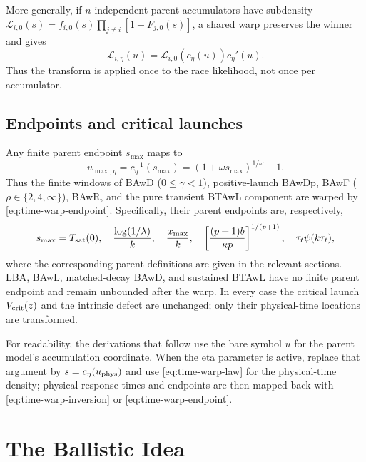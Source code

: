 \documentclass[12pt]{article}
\theoremstyle{remark}
\begin{document}
More generally, if \(n\) independent parent accumulators have subdensity \(\mathcal{L}_{i,0}(s)=f_{i,0}(s)\prod_{j\ne i}[1-F_{j,0}(s)]\), a shared warp preserves the winner and gives
\begin{equation}
  \mathcal{L}_{i,\eta}(u)
   =\mathcal{L}_{i,0}(c_\eta(u))c_\eta'(u).
  \label{eq:time-warp-race}
\end{equation}
Thus the transform is applied once to the race likelihood, not once per accumulator.

\subsection{Endpoints and critical launches}
Any finite parent endpoint \(s_{\max}\) maps to
\begin{equation}
  u_{\max,\eta}=c_\eta^{-1}(s_{\max})
    =(1+\omega s_{\max})^{1/\omega}-1.
  \label{eq:time-warp-endpoint}
\end{equation}
Thus the finite windows of BAwD (\(0\le\gamma<1\)), positive-launch BAwDp, BAwF (\(\rho\in\{2,4,\infty\}\)), BAwR, and the pure transient BTAwL component are warped by
\eqref{eq:time-warp-endpoint}. Specifically, their parent endpoints are,
respectively,
\begin{equation}
  s_{\max}=T_{\rm sat}(0),\quad
  \frac{\log(1/\lambda)}{k},\quad
  \frac{x_{\max}}{k},\quad
  \left[\frac{(p+1)b}{\kappa p}\right]^{1/(p+1)},\quad
  \tau_t\psi(k\tau_t),
  \label{eq:time-warp-endpoints-list}
\end{equation}
where the corresponding parent definitions are given in the relevant sections. LBA, BAwL, matched-decay BAwD, and sustained BTAwL have no finite parent endpoint and remain unbounded after the warp. In every case the critical launch \(V_{\rm crit}(z)\) and the intrinsic defect are unchanged; only their physical-time locations are transformed.

For readability, the derivations that follow use the bare symbol \(u\) for the parent model's accumulation coordinate. When the eta parameter is active, replace that argument by \(s=c_\eta(u_{\rm phys})\) and use
\eqref{eq:time-warp-law} for the physical-time density; physical response
times and endpoints are then mapped back with \eqref{eq:time-warp-inversion} or \eqref{eq:time-warp-endpoint}.

\section{The Ballistic Idea}
\end{document}
